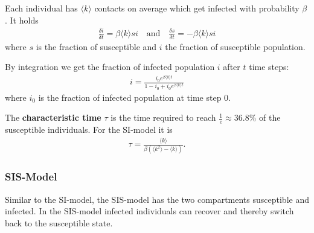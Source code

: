 \documentclass[english]{panikzettel}
\begin{document}
\begin{figure}[ht!]
	\centering
\end{figure}

Each individual has $ \langle k \rangle $ contacts on average which get infected with probability $ \beta $.
It holds
\begin{align*}
	\frac{\delta i}{\delta t} = \beta \langle k \rangle si \quad\text{and}\quad \frac{\delta s}{\delta t} = -\beta \langle k \rangle si
\end{align*}
where $ s $ is the fraction of susceptible and $ i $ the fraction of susceptible population.

By integration we get the fraction of infected population $ i $ after $ t $ time steps:
\begin{align*}
	i = \frac{i_0 e^{\beta \langle k \rangle t}}{1 - i_0 + i_0 e^{\beta \langle k \rangle t}}
\end{align*}
where $ i_0 $ is the fraction of infected population at time step 0.

The \textbf{characteristic time} $ \tau $ is the time required to reach $ \frac{1}{e} \approx 36.8\% $ of the susceptible individuals.
For the SI-model it is
\begin{align*}
	\tau = \frac{\langle k \rangle}{\beta (\langle k^2 \rangle - \langle k \rangle)}.
\end{align*}

\subsubsection{SIS-Model} \label{sec:sis_model}
Similar to the SI-model, the SIS-model has the two compartments susceptible and infected.
In the SIS-model infected individuals can recover and thereby switch back to the susceptible state.

\begin{figure}[ht!]
	\centering
\end{figure}
\end{document}
